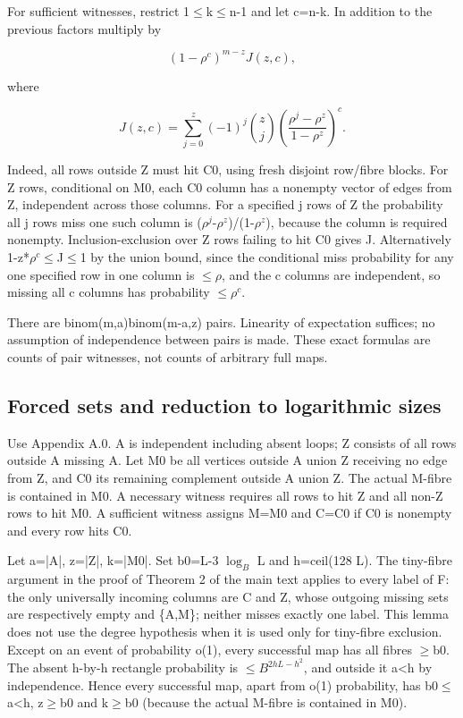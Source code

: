 \documentclass[11pt]{article}
\begin{document}
For sufficient witnesses, restrict 1\ensuremath{\leq}k\ensuremath{\leq}n-1 and let c=n-k. In addition to the previous factors multiply by

\[
(1-\rho^c)^{m-z}J(z,c),
\]

where

\[
J(z,c)=\sum_{j=0}^z(-1)^j\binom zj\left(\frac{\rho^j-\rho^z}{1-\rho^z}\right)^c.
\]

Indeed, all rows outside Z must hit C0, using fresh disjoint row/fibre blocks. For Z rows, conditional on M0, each C0 column has a nonempty vector of edges from Z, independent across those columns. For a specified j rows of Z the probability all j rows miss one such column is ($\rho^{j}$-$\rho^{z}$)/(1-$\rho^{z}$), because the column is required nonempty. Inclusion-exclusion over Z rows failing to hit C0 gives J. Alternatively 1-z*$\rho^{c}$\ensuremath{\leq}J\ensuremath{\leq}1 by the union bound, since the conditional miss probability for any one specified row in one column is \ensuremath{\leq}$\rho$, and the c columns are independent, so missing all c columns has probability \ensuremath{\leq}$\rho^{c}$.

There are binom(m,a)binom(m-a,z) pairs. Linearity of expectation suffices; no assumption of independence between pairs is made. These exact formulas are counts of pair witnesses, not counts of arbitrary full maps.

\subsection{Forced sets and reduction to logarithmic sizes}

Use Appendix A.0. A is independent including absent loops; Z consists of all rows outside A missing A. Let M0 be all vertices outside A union Z receiving no edge from Z, and C0 its remaining complement outside A union Z. The actual M-fibre is contained in M0. A necessary witness requires all rows to hit Z and all non-Z rows to hit M0. A sufficient witness assigns M=M0 and C=C0 if C0 is nonempty and every row hits C0.

Let a=|A|, z=|Z|, k=|M0|. Set b0=L-3 $\log_B$ L and h=ceil(128 L). The tiny-fibre argument in the proof of Theorem 2 of the main text applies to every label of F: the only universally incoming columns are C and Z, whose outgoing missing sets are respectively empty and \{A,M\}; neither misses exactly one label. This lemma does not use the degree hypothesis when it is used only for tiny-fibre exclusion. Except on an event of probability o(1), every successful map has all fibres \ensuremath{\geq}b0. The absent h-by-h rectangle probability is \ensuremath{\leq}$B^{2hL-h^2}$, and outside it a<h by independence. Hence every successful map, apart from o(1) probability, has b0\ensuremath{\leq}a<h, z\ensuremath{\geq}b0 and k\ensuremath{\geq}b0 (because the actual M-fibre is contained in M0).
\end{document}

